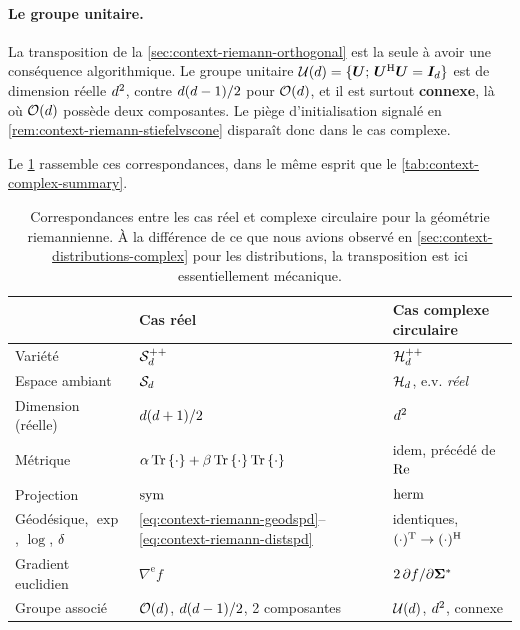 \paragraph{Le groupe unitaire.} La transposition de la \cref{sec:context-riemann-orthogonal} est la seule à avoir une conséquence algorithmique. Le groupe unitaire $\mathcal{U}(d)=\{\boldsymbol{U};\,\boldsymbol{U}^{\mathrm{H}}\boldsymbol{U}=\boldsymbol{I}_{d}\}$ est de dimension réelle $d^2$, contre $d(d-1)/2$ pour $\mathcal{O}(d)$, et il est surtout \textbf{connexe}, là où $\mathcal{O}(d)$ possède deux composantes. Le piège d'initialisation signalé en \cref{rem:context-riemann-stiefelvscone} disparaît donc dans le cas complexe.

Le \cref{tab:context-riemann-complexe} rassemble ces correspondances, dans le même esprit que le \cref{tab:context-complex-summary}.

\begin{table}
  \centering
  \footnotesize
  \begin{tabular}{@{}lll@{}}
    \toprule
     & Cas réel & Cas complexe circulaire \\
    \midrule
    Variété                 & $\mathcal{S}_{d}^{++}$ & $\mathcal{H}_{d}^{++}$ \\
    Espace ambiant          & $\mathcal{S}_{d}$ & $\mathcal{H}_{d}$, e.v. \emph{réel} \\
    Dimension (réelle)      & $d(d+1)/2$ & $d^2$ \\
    Métrique                & $\alpha\operatorname{\operatorname{Tr}}\left\{\cdot\right\}+\beta\operatorname{\operatorname{Tr}}\left\{\cdot\right\}\operatorname{\operatorname{Tr}}\left\{\cdot\right\}$ & idem, précédé de $\operatorname{\operatorname{Re}}$ \\
    Projection              & $\operatorname{\operatorname{sym}}$ & $\operatorname{\operatorname{herm}}$ \\
    Géodésique, $\exp$, $\log$, $\delta$ & \cref{eq:context-riemann-geodspd}--\cref{eq:context-riemann-distspd} & identiques, $(\cdot)^{\mathrm{T}}\to(\cdot)^{\mathrm{H}}$ \\
    Gradient euclidien      & $\nabla^{\mathrm{e}}f$ & $2\,\partial f/\partial{\boldsymbol{\Sigma}}^{*}$ \\
    Groupe associé          & $\mathcal{O}(d)$, $d(d-1)/2$, 2 composantes & $\mathcal{U}(d)$, $d^2$, connexe \\
    \bottomrule
  \end{tabular}
  \vspace{0.5em}
  \caption{Correspondances entre les cas réel et complexe circulaire pour la géométrie riemannienne. À la différence de ce que nous avions observé en \cref{sec:context-distributions-complex} pour les distributions, la transposition est ici essentiellement mécanique.}
  \label{tab:context-riemann-complexe}
\end{table}




